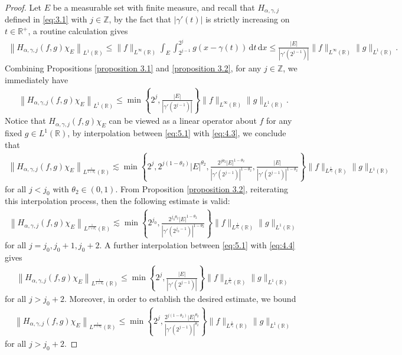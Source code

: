 \documentclass[11pt, twoside, leqno]{article}
\theoremstyle{definition}
\numberwithin{equation}{section}
\begin{document}
\begin{proof}
Let $E$ be a measurable set with finite measure, and recall that $H_{\alpha,\gamma,j}$ defined in \eqref{eq:3.1} with $j\in \mathbb{Z}$, by the fact that $|\gamma'(t)|$ is strictly increasing on $t\in\mathbb{R}^+$, a routine calculation gives
\begin{align*}
  \left\|H_{\alpha,\gamma,j}(f,g)\chi_{E}\right\|_{L^{1}(\mathbb{R})}
\leq\|f\|_{L^{\infty}(\mathbb{R})}\int_E\int_{2^{j-1}}^{2^j}g(x-\gamma(t))\,\textrm{d}t\,\textrm{d}x\leq \frac{|E|}{|\gamma'(2^{j-1})|} \|f\|_{L^{\infty}(\mathbb{R})}\|g\|_{L^{1}(\mathbb{R})}.
 \end{align*}
Combining Propositions \ref{proposition 3.1} and \ref{proposition 3.2}, for any $j\in \mathbb{Z}$, we immediately have
\begin{align}\label{eq:5.1}
  \left\|H_{\alpha,\gamma,j}(f,g)\chi_{E}\right\|_{L^{1}(\mathbb{R})}
\leq \min\left\{2^j,  \frac{|E|}{|\gamma'(2^{j-1})|} \right\} \|f\|_{L^{\infty}(\mathbb{R})}\|g\|_{L^{1}(\mathbb{R})}.
 \end{align}
Notice that $H_{\alpha,\gamma,j}(f,g)\chi_{E}$ can be viewed as a linear operator about $f$ for any fixed $g\in L^1(\mathbb{R})$, by interpolation between \eqref{eq:5.1} with \eqref{eq:4.3}, we conclude that
 \begin{align*}
  \left\|H_{\alpha,\gamma,j}(f,g)\chi_{E}\right\|_{L^{\frac{1}{1+\theta_2}}(\mathbb{R})} \lesssim \min\left\{2^j,2^{j(1-\theta_{2})}|E|^{\theta_{2}},{\frac{2^{j\theta_2}|E|^{1-\theta_{2}}}{|\gamma'(2^{j-1})|^{1-\theta_{2}}}} ,{\frac{|E|}{|\gamma'(2^{j-1})|^{1-\theta_{2}}}}\right\}\|f\|_{L^{\frac{1}{\theta_2}}(\mathbb{R})}\|g\|_{L^{1}(\mathbb{R})}
 \end{align*}
for all $j<j_0$ with $\theta_2\in (0,1)$. From Proposition \ref{proposition 3.2}, reiterating this interpolation process, then the following estimate is valid:
\begin{align*}
  \left\|H_{\alpha,\gamma,j}(f,g)\chi_{E}\right\|_{L^{\frac{1}{1+\theta_1}}(\mathbb{R})}\lesssim \min\left\{2^{j_0},\frac{2^{{j_0}\theta_{2}}|E|^{1-\theta_{2}}}{ |\gamma'(2^{j_0-1})|^{1-\theta_{2}} }\right\}\|f\|_{L^{\frac{1}{\theta_2}}(\mathbb{R})}\|g\|_{L^{1}(\mathbb{R})}
  \end{align*}
for all $j=j_0, j_0+1, j_0+2$. A further interpolation between \eqref{eq:5.1} with \eqref{eq:4.4} gives
\begin{align}\label{eq:5.a}
  \left\|H_{\alpha,\gamma,j}(f,g)\chi_{E}\right\|_{L^{\frac{1}{1+\theta_2}}(\mathbb{R})}
\leq \min\left\{2^j,  \frac{|E|}{|\gamma'(2^{j-1})|} \right\} \|f\|_{L^{\frac{1}{\theta_2}}(\mathbb{R})}\|g\|_{L^{1}(\mathbb{R})}
 \end{align}
for all $j>j_0+2$. Moreover, in order to establish the desired estimate, we bound
\begin{align}\label{eq:5.b}
  \left\|H_{\alpha,\gamma,j}(f,g)\chi_{E}\right\|_{L^{\frac{1}{1+\theta_2}}(\mathbb{R})}
\leq \min\left\{2^j,  \frac{2^{j(1-\theta_2)}|E|^{\theta_2}}{|\gamma'(2^{j-1})|^{\theta_2}} \right\} \|f\|_{L^{\frac{1}{\theta_2}}(\mathbb{R})}\|g\|_{L^{1}(\mathbb{R})}
 \end{align}
for all $j>j_0+2$.


\end{proof}
\end{document}
